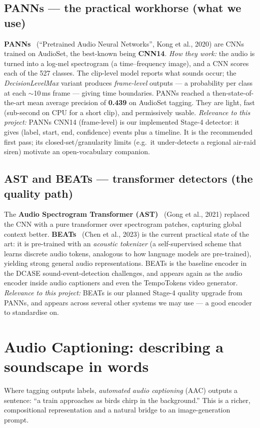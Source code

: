 \documentclass[11pt,a4paper]{article}
\newcommand{\rel}[1]{\smallskip\noindent\textit{Relevance to this project:} #1}
\begin{document}
\subsection{PANNs --- the practical workhorse (what we use)}
\textbf{PANNs}~\cite{panns} (``Pretrained Audio Neural Networks'', Kong et al., 2020) are CNNs trained
on AudioSet, the best-known being \textbf{CNN14}. \emph{How they work:} the audio is turned into a
log-mel spectrogram (a time--frequency image), and a CNN scores each of the 527 classes. The clip-level
model reports what sounds occur; the \emph{DecisionLevelMax} variant produces \emph{frame-level}
outputs --- a probability per class at each $\sim$10\,ms frame --- giving time boundaries. PANNs reached
a then-state-of-the-art mean average precision of \textbf{0.439} on AudioSet tagging. They are light,
fast (sub-second on CPU for a short clip), and permissively usable.
\rel{PANNs CNN14 (frame-level) is our implemented Stage-4 detector: it gives (label, start, end,
confidence) events plus a timeline. It is the recommended first pass; its closed-set/granularity
limits (e.g.\ it under-detects a regional air-raid siren) motivate an open-vocabulary companion.}

\subsection{AST and BEATs --- transformer detectors (the quality path)}
The \textbf{Audio Spectrogram Transformer (AST)}~\cite{ast} (Gong et al., 2021) replaced the CNN with a
pure transformer over spectrogram patches, capturing global context better. \textbf{BEATs}~\cite{beats}
(Chen et al., 2023) is the current practical state of the art: it is pre-trained with an
\emph{acoustic tokenizer} (a self-supervised scheme that learns discrete audio tokens, analogous to
how language models are pre-trained), yielding strong general audio representations. BEATs is the
baseline encoder in the DCASE sound-event-detection challenges, and appears again as the audio encoder
inside audio captioners and even the TempoTokens video generator.
\rel{BEATs is our planned Stage-4 quality upgrade from PANNs, and appears across several other systems
we may use --- a good encoder to standardise on.}

\section{Audio Captioning: describing a soundscape in words}
Where tagging outputs labels, \emph{automated audio captioning} (AAC) outputs a sentence: ``a train
approaches as birds chirp in the background.'' This is a richer, compositional representation and a
natural bridge to an image-generation prompt.
\end{document}

